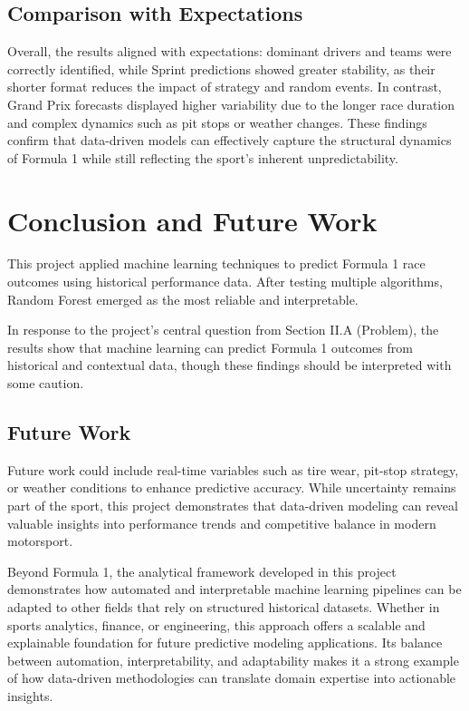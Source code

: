 \documentclass[11pt,a4paper]{article}
\begin{document}
\subsection{Comparison with Expectations}
\label{subsec:Comparison with Expectations}

Overall, the results aligned with expectations: dominant drivers and teams were correctly identified, while Sprint predictions showed greater stability, as their shorter format reduces the impact of strategy and random events. In contrast, Grand Prix forecasts displayed higher variability due to the longer race duration and complex dynamics such as pit stops or weather changes. These findings confirm that data-driven models can effectively capture the structural dynamics of Formula 1 while still reflecting the sport’s inherent unpredictability.



\section{Conclusion and Future Work}
\label{sec:conclusion}

This project applied machine learning techniques to predict Formula 1 race outcomes using historical performance data. After testing multiple algorithms, Random Forest emerged as the most reliable and interpretable.

In response to the project’s central question from Section II.A (Problem), the results show that machine learning can predict Formula 1 outcomes from historical and contextual data, though these findings should be interpreted with some caution.

\subsection{Future Work}
\label{subsec:Future Work}

Future work could include real-time variables such as tire wear, pit-stop strategy, or weather conditions to enhance predictive accuracy. While uncertainty remains part of the sport, this project demonstrates that data-driven modeling can reveal valuable insights into performance trends and competitive balance in modern motorsport.

Beyond Formula 1, the analytical framework developed in this project demonstrates how automated and interpretable machine learning pipelines can be adapted to other fields that rely on structured historical datasets. Whether in sports analytics, finance, or engineering, this approach offers a scalable and explainable foundation for future predictive modeling applications. Its balance between automation, interpretability, and adaptability makes it a strong example of how data-driven methodologies can translate domain expertise into actionable insights.
\end{document}
